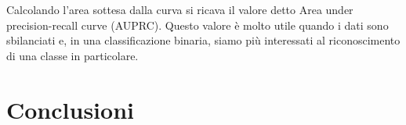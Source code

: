 \documentclass[12pt,a4paper,titlepage]{article}
\begin{document}
Calcolando l'area sottesa dalla curva si ricava il valore detto Area under precision-recall curve (AUPRC).
Questo valore è molto utile quando i dati sono sbilanciati e, in una classificazione binaria, siamo più interessati al riconoscimento di una classe in particolare.
\clearpage

\section{Conclusioni}
\clearpage

\nocite{*}
\printbibliography
\end{document}
